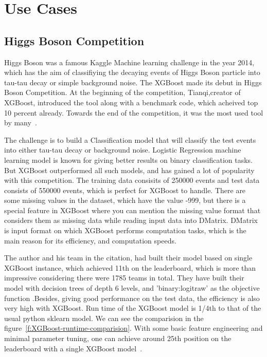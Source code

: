 \section{Use Cases}

\subsection{Higgs Boson Competition}

Higgs Boson was a famous Kaggle Machine learning challenge in the year 2014,
which has the  aim of classifiying the decaying events of Higgs Boson particle
into tau-tau decay or simple  background noise. The XGBoost made its debut in
Higgs Boson Competition. At the beginning of  the competition, Tianqi,creator
of XGBoost, introduced the tool along with a benchmark code,  which acheived
top 10 percent already. Towards the end of the competition, it was the most
used tool by many~\cite{hid-sp18-401-Kaggle-Higgs-Boson}. 

The challenge is to build a Classification model that will classify the test
events into either tau-tau decay or background noise. Logistic Regression
machine learning model is known for giving better results on binary
classification tasks. But XGBoost outperformed all such models, and has gained
a lot of popularity with this competition. The training data consisits of
250000 events and test data consists of 550000 events, which is perfect for
XGBoost to handle. There are some missing values in the dataset, which  have
the value -999, but there is a special feature in XGBoost where you can
mention the missing value format that considers them as missing data while
reading input data into DMatrix. DMatrix is input format on which XGBoost
performs computation tasks, which is the main reason for its efficiency, and
computation speeds.

The author and his team in the citation, had built their model based on single
XGBoost instance, which achieved 11th on the leaderboard, which is more than
impressive considering there were 1785 teams in total. They have built their
model with decision trees of depth 6 levels, and 'binary:logitraw' as the
objective function .Besides, giving good performance on the test data, the
efficiency is also very high with XGBoost. Run time of the XGBoost model is
1/4th to that of the usual python sklearn model. We can see the comparision in
the figure~\ref{f:XGBoost-runtime-comparision}. With some basic feature
engineering and minimal parameter tuning, one can achieve around 25th position
on the leaderboard with a single XGBoost model~\cite{hid-sp18-401-XGBoost-pdf}.

